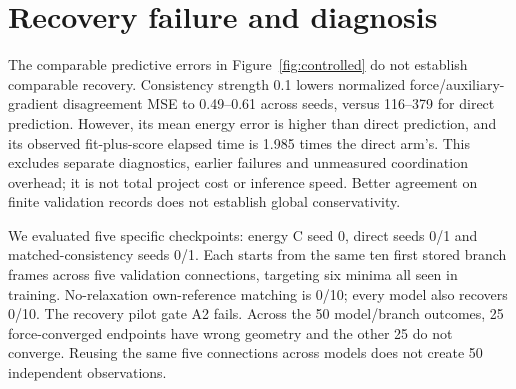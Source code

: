 \documentclass{article}
\begin{document}
\section{Recovery failure and diagnosis}
The comparable predictive errors in Figure~\ref{fig:controlled} do not establish comparable recovery. Consistency strength 0.1 lowers normalized force/auxiliary-gradient disagreement MSE to 0.49--0.61 across seeds, versus 116--379 for direct prediction. However, its mean energy error is higher than direct prediction, and its observed fit-plus-score elapsed time is 1.985 times the direct arm's. This excludes separate diagnostics, earlier failures and unmeasured coordination overhead; it is not total project cost or inference speed. Better agreement on finite validation records does not establish global conservativity.

We evaluated five specific checkpoints: energy C seed 0, direct seeds 0/1 and matched-consistency seeds 0/1. Each starts from the same ten first stored branch frames across five validation connections, targeting six minima all seen in training. No-relaxation own-reference matching is 0/10; every model also recovers 0/10. The recovery pilot gate A2 fails. Across the 50 model/branch outcomes, 25 force-converged endpoints have wrong geometry and the other 25 do not converge. Reusing the same five connections across models does not create 50 independent observations.
\end{document}

